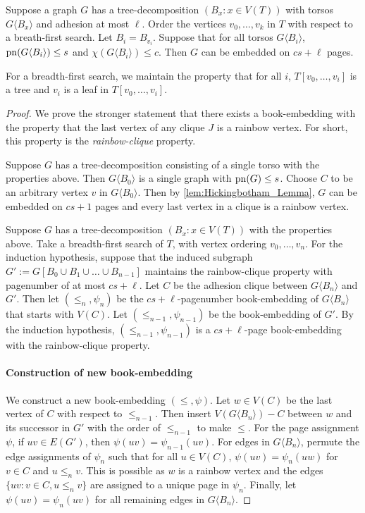 \begin{theorem}
	Suppose a graph \(G\) has a tree-decomposition \((B_x: x \in V(T))\) with torsos \(G \langle B_x \rangle\) and adhesion at most \(\ell\). Order the vertices \(v_0, \ldots, v_k\) in $T$ with respect to a breath-first search. Let $B_i = B_{v_i}$. Suppose that for all torsos $G\langle B_i \rangle$, \(\operatorname{pn}(G\langle B_i \rangle) \leq s\) and \(\chi(G\langle B_i \rangle) \leq c\). Then \(G\) can be embedded on \(cs + \ell\) pages.
\end{theorem}
For a breadth-first search, we maintain the property that for all \(i\), \(T[v_0, \ldots, v_{i}]\) is a tree and \(v_i\) is a leaf in \(T[v_0, \ldots, v_{i}]\).
\begin{proof}
	We prove the stronger statement that there exists a book-embedding with the property that the last vertex of any clique \(J\) is a rainbow vertex. For short, this property is the \textit{rainbow-clique} property. 

	Suppose $G$ has a tree-decomposition consisting of a single torso with the properties above. Then \(G\langle B_0 \rangle\) is a single graph with \(\operatorname{pn}(G) \leq s\). Choose \(C\) to be an arbitrary vertex \(v\) in \(G\langle B_0 \rangle\). Then by \cref{lem:Hickingbotham_Lemma}, $G$ can be embedded on \(cs + 1\) pages and every last vertex in a clique is a rainbow vertex.

	Suppose $G$ has a tree-decomposition $(B_x: x \in V(T))$ with the properties above. Take a breadth-first search of $T$, with vertex ordering $v_0, \ldots, v_n$. For the induction hypothesis, suppose that the induced subgraph $G' := G[B_0 \cup B_1 \cup \ldots \cup B_{n-1}]$ maintains the rainbow-clique property with pagenumber of at most \(cs + \ell\).  
	Let \(C\) be the adhesion clique between \(G \langle B_n \rangle\) and $G'$. Then let \((\leq_n, \psi_n)\) be the \(cs + \ell\)-pagenumber book-embedding of \(G \langle B_n \rangle\) that starts with \(V(C)\). Let \((\leq_{n-1}, \psi_{n-1})\) be the book-embedding of \(G'\). By the induction hypothesis, \((\leq_{n-1}, \psi_{n-1})\) is a \(cs + \ell\)-page book-embedding with the rainbow-clique property.

	\paragraph{Construction of new book-embedding}
	We construct a new book-embedding \((\leq, \psi)\).
	Let \(w \in V(C)\) be the last vertex of \(C\) with respect to \(\leq_{n-1}\). Then insert \(V(G \langle B_n \rangle) - C\) between \(w\) and its successor in $G'$ with the order of \(\leq_{n-1}\) to make $\leq$. For the page assignment \(\psi\), if \(uv \in E(G')\), then \(\psi(uv) = \psi_{n-1}(uv)\). For edges in $G \langle B_n \rangle$, permute the edge assignments of \(\psi_n\) such that for all \(u \in V(C)\), \(\psi(uv) = \psi_n(uw)\) for $v \in C$ and $u \leq_n v$. This is possible as \(w\) is a rainbow vertex and the edges \(\{uv : v \in C, u \leq_n v\}\) are assigned to a unique page in \(\psi_n\). Finally, let \(\psi(uv) = \psi_n(uv)\) for all remaining edges in $G \langle B_n \rangle$. 

\end{proof}
